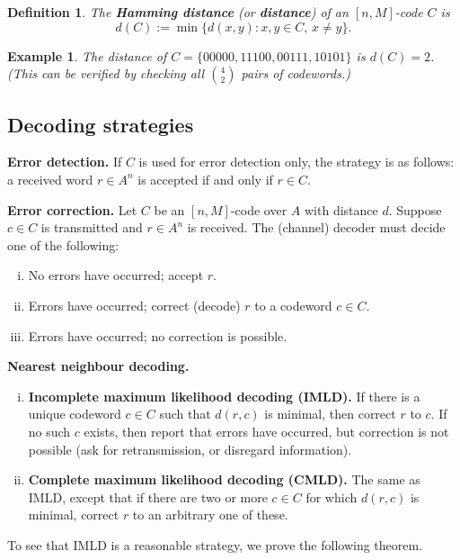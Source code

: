 \documentclass[10pt]{article}
\theoremstyle{newstyle}
\newtheorem{defn}[thm]{Definition}
\newtheorem{exmp}[thm]{Example}
\begin{document}
\begin{defn}
The {\bf Hamming distance} (or {\bf distance}) of an $[n, M]$-code $C$ is 
\[ d(C) := \min\{d(x, y) : x, y \in C,\, x \neq y\}. \]
\end{defn}

\begin{exmp}
The distance of $C = \{00000, 11100, 00111, 10101\}$ is $d(C) = 2$. (This can be verified 
by checking all $\binom42$ pairs of codewords.)
\end{exmp}

\subsection{Decoding strategies}

{\bf Error detection.} If $C$ is used for error detection only, the strategy is as follows: 
a received word $r \in A^n$ is accepted if and only if $r \in C$.

{\bf Error correction.} Let $C$ be an $[n, M]$-code over $A$ with distance $d$. 
Suppose $c \in C$ is transmitted and $r \in A^n$ is received. The (channel) decoder must decide 
one of the following:
\begin{enumerate}[(i)]
    \item No errors have occurred; accept $r$.
    \item Errors have occurred; correct (decode) $r$ to a codeword $c \in C$. 
    \item Errors have occurred; no correction is possible.
\end{enumerate}

{\bf Nearest neighbour decoding.}
\begin{enumerate}[(i)]
    \item {\bf Incomplete maximum likelihood decoding (IMLD).} 
    If there is a unique codeword $c \in C$ such that $d(r, c)$ is minimal, 
    then correct $r$ to $c$. If no such $c$ exists, then report that errors have occurred, 
    but correction is not possible (ask for retransmission, or disregard information).
    \item {\bf Complete maximum likelihood decoding (CMLD).} 
    The same as IMLD, except that if there are two or more $c \in C$ for which $d(r, c)$ 
    is minimal, correct $r$ to an arbitrary one of these.
\end{enumerate}

To see that IMLD is a reasonable strategy, we prove the following theorem.
\end{document}
